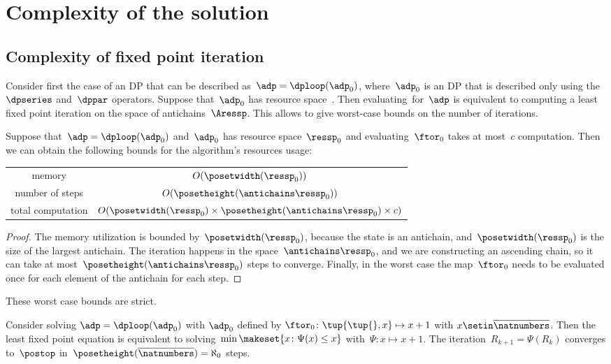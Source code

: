 
\section{Complexity of the solution}

\subsection{Complexity of fixed point iteration}

Consider first the case of an DP that can be described as~$\adp=\dploop(\adp_{0})$, where~$\adp_{0}$ is an DP that is described only using the~$\dpseries$ and~$\dppar$ operators.
Suppose that~$\adp_{0}$ has resource space~\ressp.
Then evaluating~\ftor for~$\adp$ is equivalent to computing a least fixed point iteration on the space of antichains~$\Aressp$.
This allows to give worst-case bounds on the number of iterations.

\begin{proposition}
    \label{prop:complexity}
    Suppose that~$\adp=\dploop(\adp_{0})$ and~$\adp_{0}$ has resource space~$\ressp_{0}$ and evaluating~$\ftor_{0}$ takes at most~$c$ computation.
    Then we can obtain the following bounds for the algorithm's resources usage:

    \smallskip{}
    \begin{tabular}{cc}
        memory            & $O(\posetwidth(\ressp_{0}))$\tabularnewline
        number of steps   & $O(\posetheight(\antichains\ressp_{0}))$\tabularnewline
        total computation & $O(\posetwidth(\ressp_{0})\times\posetheight(\antichains\ressp_{0})\times c)$\tabularnewline
    \end{tabular}

\end{proposition}
\begin{proof}
    The memory utilization is bounded by~$\posetwidth(\ressp_{0})$, because the state is an antichain, and~$\posetwidth(\ressp_{0})$ is the size of the largest antichain.
    The iteration happens in the space~$\antichains\ressp_{0}$, and we are constructing an ascending chain, so it can take at most~$\posetheight(\antichains\ressp_{0})$ steps to converge.
    Finally, in the worst case the map~$\ftor_{0}$ needs to be evaluated once for each element of the antichain for each step.
\end{proof}
These worst case bounds are strict.
\begin{example}
    Consider solving $\adp=\dploop(\adp_{0})$ with $\adp_{0}$ defined by $\ftor_{0}\colon\tup{ \tup{ } ,x} \mapsto x+1$ with $x\setin\overline{\natnumbers}$.
    Then the least fixed point equation is equivalent to solving~$\min\makeset{x\colon\Psi(x)\leq x}$ with~$\Psi:x\mapsto x+1$.
    The iteration~$R_{k+1}=\Psi(R_{k})$ converges to~$\postop$ in~$\posetheight(\overline{\natnumbers})=\aleph_{0}$ steps.
\end{example}

